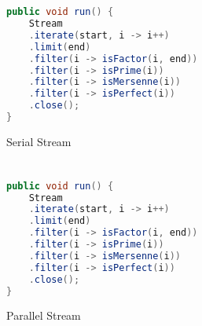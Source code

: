 \documentclass[]{report}
\begin{document}
\chapter{}
\begin{figure}[h!]
	\caption{Serial Stream}
	\begin{lstlisting}[language=Java,frame=single]
public void run() {
	Stream
	.iterate(start, i -> i++)
	.limit(end)
	.filter(i -> isFactor(i, end))
	.filter(i -> isPrime(i))
	.filter(i -> isMersenne(i))
	.filter(i -> isPerfect(i))
	.close();
}
	\end{lstlisting}
\end{figure}
\chapter{}
\begin{figure}[h!]
	\caption{Parallel Stream}
	\begin{lstlisting}[language=Java,frame=single]
public void run() {
    Stream
    .iterate(start, i -> i++)
    .limit(end)
    .filter(i -> isFactor(i, end))
    .filter(i -> isPrime(i))
    .filter(i -> isMersenne(i))
    .filter(i -> isPerfect(i))
    .close();
}
	\end{lstlisting}
\end{figure}
\end{document}
